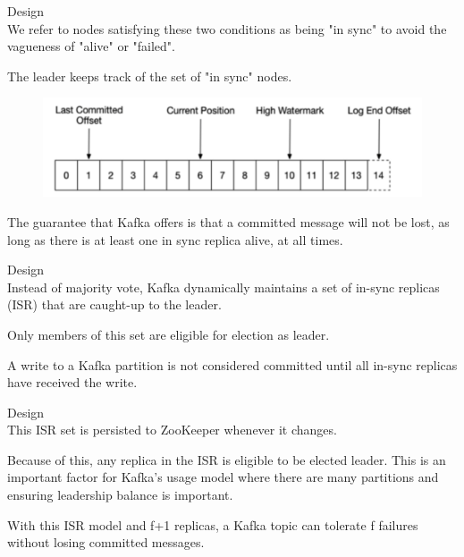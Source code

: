 \begin{frame}[plain,t]{Design} %
     \\
    \vspace{2ex}
    We refer to nodes satisfying these two conditions as being "in sync" to avoid the vagueness of "alive" or "failed". 
    
     \vspace{2ex}
    The leader keeps track of the set of "in sync" nodes.
    
    \begin{figure}
        \centering
        \includegraphics[width=0.9\linewidth]{image/0211}
        \label{fig:0211}
    \end{figure}
    
    The guarantee that Kafka offers is that a committed message will not be lost, as long as there is at least one in sync replica alive, at all times.
    

    
    
\end{frame}
\begin{frame}[plain,t]{Design} %
     \\
    \vspace{2ex}
    Instead of majority vote, Kafka dynamically maintains a set of in-sync replicas (ISR) that are caught-up to the leader. 
    
     \vspace{2ex}
    Only members of this set are eligible for election as leader. 
    
     \vspace{2ex}
    A write to a Kafka partition is not considered committed until all in-sync replicas have received the write. 
    
    
\end{frame}
\begin{frame}[plain,t]{Design} %
     \\
    \vspace{2ex}
    This ISR set is persisted to ZooKeeper whenever it changes. 
    
    \vspace{2ex}
    Because of this, any replica in the ISR is eligible to be elected leader. This is an important factor for Kafka's usage model where there are many partitions and ensuring leadership balance is important. 
    
    \vspace{2ex}
    With this ISR model and f+1 replicas, a Kafka topic can tolerate f failures without losing committed messages.
    
    
\end{frame}
